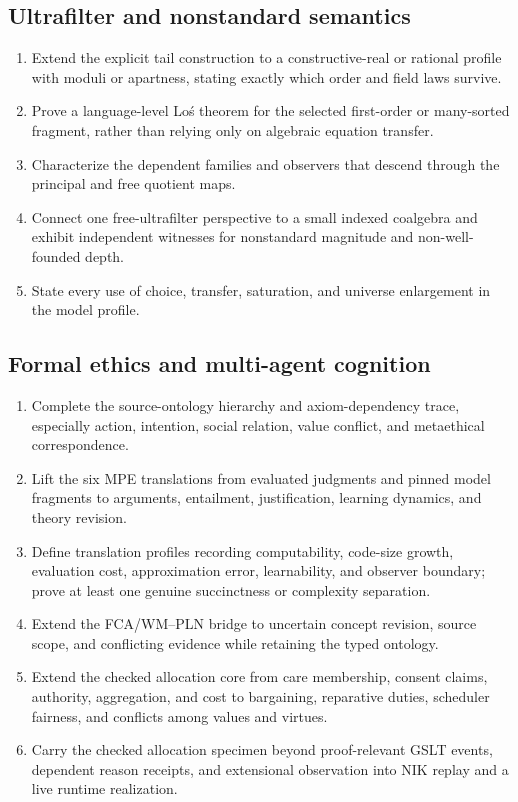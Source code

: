 \documentclass[11pt]{article}
\theoremstyle{definition}
\theoremstyle{remark}
\begin{document}
\subsection{Ultrafilter and nonstandard semantics}

\begin{enumerate}
\item Extend the explicit tail construction to a constructive-real or rational
  profile with moduli or apartness, stating exactly which order and field laws
  survive.
\item Prove a language-level Lo\'s theorem for the selected first-order or
  many-sorted fragment, rather than relying only on algebraic equation transfer.
\item Characterize the dependent families and observers that descend through
  the principal and free quotient maps.
\item Connect one free-ultrafilter perspective to a small indexed coalgebra and
  exhibit independent witnesses for nonstandard magnitude and non-well-founded
  depth.
\item State every use of choice, transfer, saturation, and universe enlargement
  in the model profile.
\end{enumerate}

\subsection{Formal ethics and multi-agent cognition}

\begin{enumerate}
\item Complete the source-ontology hierarchy and axiom-dependency trace,
  especially action, intention, social relation, value conflict, and
  metaethical correspondence.
\item Lift the six MPE translations from evaluated judgments and pinned model
  fragments to arguments, entailment, justification, learning dynamics, and
  theory revision.
\item Define translation profiles recording computability, code-size growth,
  evaluation cost, approximation error, learnability, and observer boundary;
  prove at least one genuine succinctness or complexity separation.
\item Extend the FCA/WM--PLN bridge to uncertain concept revision, source scope,
  and conflicting evidence while retaining the typed ontology.
\item Extend the checked allocation core from care membership, consent claims,
  authority, aggregation, and cost to bargaining, reparative duties, scheduler
  fairness, and conflicts among values and virtues.
\item Carry the checked allocation specimen beyond proof-relevant GSLT events,
  dependent reason receipts, and extensional observation into NIK replay and a
  live runtime realization.
\end{enumerate}
\end{document}
